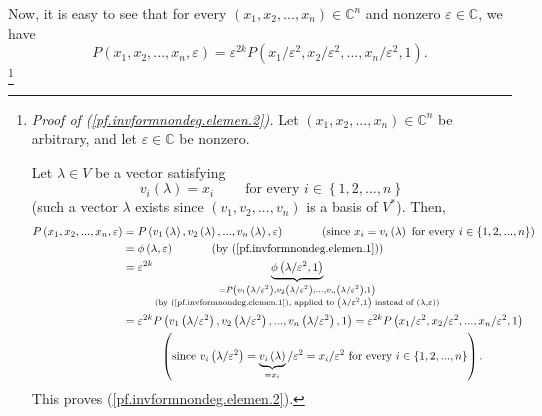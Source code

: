 \documentclass[etingof-lie.tex]{subfiles}
\begin{document}
Now, it is easy to see that for every $\left(  x_{1},x_{2},...,x_{n}\right)
\in\mathbb{C}^{n}$ and nonzero $\varepsilon\in\mathbb{C}$, we have
\begin{equation}
P\left(  x_{1},x_{2},...,x_{n},\varepsilon\right)  =\varepsilon^{2k}P\left(
x_{1}/\varepsilon^{2},x_{2}/\varepsilon^{2},...,x_{n}/\varepsilon
^{2},1\right)  . \label{pf.invformnondeg.elemen.2}%
\end{equation}
\footnote{\textit{Proof of (\ref{pf.invformnondeg.elemen.2}).} Let $\left(
x_{1},x_{2},...,x_{n}\right)  \in\mathbb{C}^{n}$ be arbitrary, and let
$\varepsilon\in\mathbb{C}$ be nonzero.
\par
Let $\lambda\in V$ be a vector satisfying%
\[
v_{i}\left(  \lambda\right)  =x_{i}\ \ \ \ \ \ \ \ \ \ \text{for every }%
i\in\left\{  1,2,...,n\right\}
\]
(such a vector $\lambda$ exists since $\left(  v_{1},v_{2},...,v_{n}\right)  $
is a basis of $V^{\ast}$). Then,%
\begin{align*}
P\left(  x_{1},x_{2},...,x_{n},\varepsilon\right)   &  =P\left(  v_{1}\left(
\lambda\right)  ,v_{2}\left(  \lambda\right)  ,...,v_{n}\left(  \lambda
\right)  ,\varepsilon\right)  \ \ \ \ \ \ \ \ \ \ \left(  \text{since }%
x_{i}=v_{i}\left(  \lambda\right)  \text{ for every }i\in\left\{
1,2,...,n\right\}  \right) \\
&  =\phi\left(  \lambda,\varepsilon\right)  \ \ \ \ \ \ \ \ \ \ \left(
\text{by (\ref{pf.invformnondeg.elemen.1})}\right) \\
&  =\varepsilon^{2k}\underbrace{\phi\left(  \lambda/\varepsilon^{2},1\right)
}_{\substack{=P\left(  v_{1}\left(  \lambda/\varepsilon^{2}\right)
,v_{2}\left(  \lambda/\varepsilon^{2}\right)  ,...,v_{n}\left(  \lambda
/\varepsilon^{2}\right)  ,1\right)  \\\text{(by
(\ref{pf.invformnondeg.elemen.1}), applied to }\left(  \lambda/\varepsilon
^{2},1\right)  \text{ instead of }\left(  \lambda,\varepsilon\right)
\text{)}}}\\
&  =\varepsilon^{2k}P\left(  v_{1}\left(  \lambda/\varepsilon^{2}\right)
,v_{2}\left(  \lambda/\varepsilon^{2}\right)  ,...,v_{n}\left(  \lambda
/\varepsilon^{2}\right)  ,1\right)  =\varepsilon^{2k}P\left(  x_{1}%
/\varepsilon^{2},x_{2}/\varepsilon^{2},...,x_{n}/\varepsilon^{2},1\right) \\
&  \ \ \ \ \ \ \ \ \ \ \left(  \text{since }v_{i}\left(  \lambda
/\varepsilon^{2}\right)  =\underbrace{v_{i}\left(  \lambda\right)  }_{=x_{i}%
}/\varepsilon^{2}=x_{i}/\varepsilon^{2}\text{ for every }i\in\left\{
1,2,...,n\right\}  \right)  .
\end{align*}
This proves (\ref{pf.invformnondeg.elemen.2}).}
\end{document}
